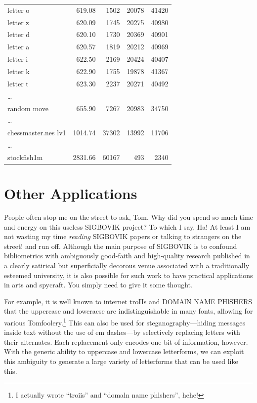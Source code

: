 \documentclass[twocolumn]{article}
\begin{document}
{\begin{center}
\begin{supertabular}{lrrrr}
letter o & 619.08 & 1502 & 20078 & 41420 \\
letter z & 620.09 & 1745 & 20275 & 40980 \\
letter d & 620.10 & 1730 & 20369 & 40901 \\
letter a & 620.57 & 1819 & 20212 & 40969 \\
letter i & 622.50 & 2169 & 20424 & 40407 \\
letter k & 622.90 & 1755 & 19878 & 41367 \\
letter t & 623.30 & 2237 & 20271 & 40492 \\
\ldots \\
random move & 655.90 & 7267 & 20983 & 34750 \\
\ldots \\
chessmaster.nes lv1 & 1014.74 & 37302 & 13992 & 11706 \\
\ldots \\
stockfish1m & 2831.66 & 60167 & 493 & 2340 \\
\end{supertabular}
\end{center}
}



\section{Other Applications}

People often stop me on the street to ask, Tom, Why did you spend so
much time and energy on this useless SIGBOVIK project? To which I say,
Ha! At least I am not wasting my time {\it reading} SIGBOVIK papers or
talking to strangers on the street! and run off. Although the main
purpose of SIGBOVIK is to confound bibliometrics with ambiguously
good-faith and high-quality research published in a clearly satirical
but superficially decorous venue associated with a traditionally
esteemed university, it is also possible for such work to have
practical applications in arts and spycraft. You simply need to give
it some thought.

For example, it is well known to {\sf internet troIIs} and {\sf DOMAlN
  NAME PHlSHERS} that the uppercase  and loweracse
 are indistinguishable in many fonts, allowing for
various Tomfoolery.\footnote{I actually wrote ``troiis'' and ``domaln
  name phlshers'', hehe!} This can also be used for
steganography---hiding messages inside text without the use of em
dashes---by selectively replacing letters with their alternates. Each
replacement only encodes one bit of information, however. With the
generic ability to uppercase and lowercase letterforms, we can exploit
this ambiguity to generate a large variety of letterforms that can be
used like this.
\end{document}
